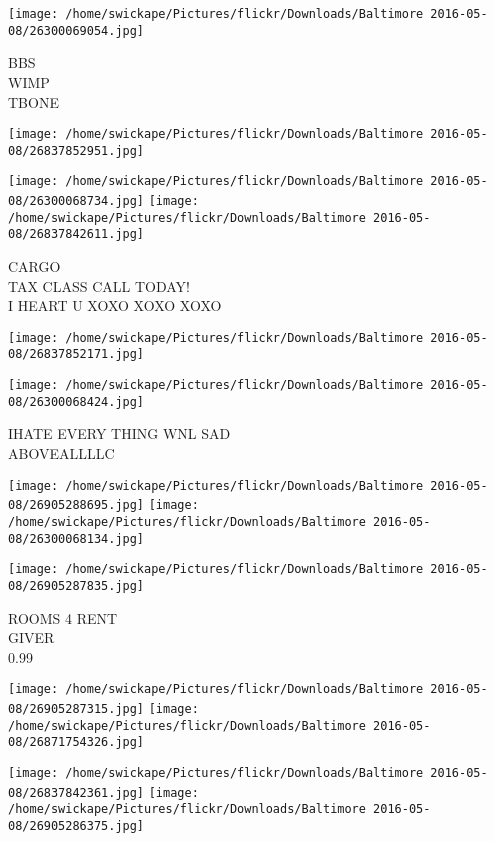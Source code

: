 \documentclass[10pt,letterpaper]{article}
\begin{document}
\texttt{[image: /home/swickape/Pictures/flickr/Downloads/Baltimore 2016-05-08/26300069054.jpg]}

BBS\\
WIMP\\
TBONE\\
\pagebreak

\texttt{[image: /home/swickape/Pictures/flickr/Downloads/Baltimore 2016-05-08/26837852951.jpg]}

\vspace{0.25in}
\texttt{[image: /home/swickape/Pictures/flickr/Downloads/Baltimore 2016-05-08/26300068734.jpg]}
\texttt{[image: /home/swickape/Pictures/flickr/Downloads/Baltimore 2016-05-08/26837842611.jpg]}

CARGO\\
TAX CLASS CALL TODAY!\\
I HEART U XOXO XOXO XOXO\\
\pagebreak

\texttt{[image: /home/swickape/Pictures/flickr/Downloads/Baltimore 2016-05-08/26837852171.jpg]}

\vspace{0.25in}
\texttt{[image: /home/swickape/Pictures/flickr/Downloads/Baltimore 2016-05-08/26300068424.jpg]}

IHATE EVERY THING WNL SAD\\
ABOVEALLLLC\\
\pagebreak

\texttt{[image: /home/swickape/Pictures/flickr/Downloads/Baltimore 2016-05-08/26905288695.jpg]}
\texttt{[image: /home/swickape/Pictures/flickr/Downloads/Baltimore 2016-05-08/26300068134.jpg]}

\vspace{0.25in}
\texttt{[image: /home/swickape/Pictures/flickr/Downloads/Baltimore 2016-05-08/26905287835.jpg]}

ROOMS 4 RENT\\
GIVER\\
0.99\\
\pagebreak

\texttt{[image: /home/swickape/Pictures/flickr/Downloads/Baltimore 2016-05-08/26905287315.jpg]}
\texttt{[image: /home/swickape/Pictures/flickr/Downloads/Baltimore 2016-05-08/26871754326.jpg]}

\texttt{[image: /home/swickape/Pictures/flickr/Downloads/Baltimore 2016-05-08/26837842361.jpg]}
\texttt{[image: /home/swickape/Pictures/flickr/Downloads/Baltimore 2016-05-08/26905286375.jpg]}
\end{document}
